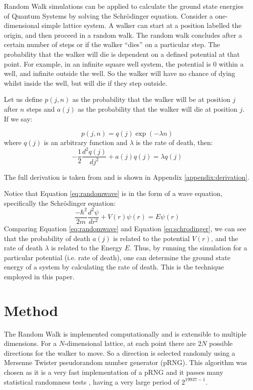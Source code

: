 \documentclass[journal]{IEEEtran}
\begin{document}
Random Walk simulations can be applied to calculate the ground state energies of
Quantum Systems by solving the Schr\"{o}dinger equation. Consider a
one-dimensional simple lattice system. A walker can start at a position labelled
the origin, and then proceed in a random walk. The random walk concludes after a
certain number of steps or if the walker ``dies'' on a particular step. The
probability that the walker will die is dependent on a defined potential at that
point. For example, in an infinite square well system, the potential is 0 within
a well, and infinite outside the well. So the walker will have no chance of
dying whilst inside the well, but will die if they step outside.

Let us define $p(j,n)$ as the probability that the walker will be at position
$j$ after $n$ steps and $a(j)$ as the probability that the walker will die at
position $j$. If we say:

\begin{equation}
  p(j,n) = q(j) \exp(-\lambda n)
  \label{eq:firsteq}
\end{equation}
where $q(j)$ is an arbitrary function and $\lambda$ is the rate of death, then:
\begin{equation}
  -\frac{1}{2} \frac{d^2q(j)}{dj^2} + a(j)q(j) = \lambda q(j)
  \label{eq:randomwave}
\end{equation}

The full derivation is taken from  and is shown in Appendix
\ref{appendix:derivation}.

Notice that Equation \ref{eq:randomwave} is in the form of a wave equation,
specifically the Schr\"{o}dinger equation:
\begin{equation}
  \label{eq:schrodinger}
  \frac{-\hbar^2}{2m}\frac{d^2 \psi}{dr^2} + V(r)\psi(r) = E\psi(r)
\end{equation}
Comparing Equation \ref{eq:randomwave} and Equation \ref{eq:schrodinger}, we can
see that the probability of death $a(j)$ is related to the potential $V(r)$,
and the rate of death $\lambda$ is related to the Energy $E$. Thus, by running
the simulation for a particular potential (i.e. rate of death), one can
determine the ground state energy of a system by calculating the rate of
death. This is the technique employed in this paper.

\section{Method}

The Random Walk is implemented computationally  and is extensible
to multiple dimensions. For a $N$-dimensional lattice, at each point there are
$2N$ possible directions for the walker to move. So a direction is selected
randomly using a Mersenne Twister pseudorandom number generator (pRNG). This algorithm
was chosen as it is a very fast implementation of a pRNG  and it
passes many statistical randomness tests , having a very large
period of $2^{19937-1}$.
\end{document}
